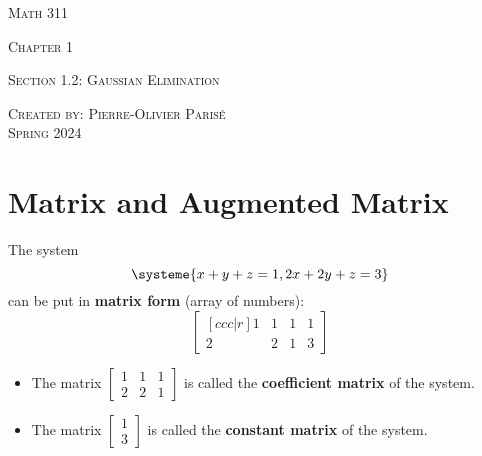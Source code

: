 \documentclass[20pt,a4paper]{extarticle}
\newcounter{definition}
\begin{document}
\thispagestyle{empty}

\begin{center}
\vspace*{2.5cm}

{\Huge \textsc{Math 311}}

\vspace*{2cm}

{\LARGE \textsc{Chapter 1}} 

\vspace*{0.75cm}

\noindent\textsc{Section 1.2: Gaussian Elimination}

\vspace*{0.75cm}

\tableofcontents

\vfill

\noindent \textsc{Created by: Pierre-Olivier Paris{\'e}} \\
\textsc{Spring 2024}
\end{center}

\newpage

\section{Matrix and Augmented Matrix}

The system
	\[
		\systeme{x + y + z = 1, 2x + 2y  +z = 3}
	\]
can be put in \textbf{matrix form} (array of numbers):
	\[
		\begin{bmatrix}[ccc|r] 
		1 & 1 & 1 & 1 \\ 
		2 & 2 & 1 & 3 
		\end{bmatrix}
	\]

\begin{definition}
\begin{itemize}
	\item The matrix $\begin{bmatrix} 1 & 1 & 1 \\ 2 & 2 & 1 \end{bmatrix}$ is called the \textbf{coefficient matrix} of the system.
	\item The matrix $\begin{bmatrix} 1 \\ 3 \end{bmatrix}$ is called the \textbf{constant matrix} of the system.
\end{itemize}
\end{definition}

\vspace*{20pt}
\end{document}
